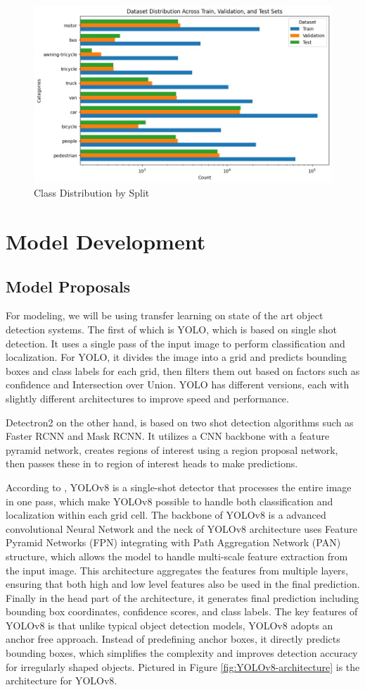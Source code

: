 \documentclass[stu,12pt,floatsintext]{apa7}
\begin{document}
\begin{figure}[!htb]
	\centering
	\includegraphics[width=0.75\linewidth]{class_distribution.png}
	\caption{Class Distribution by Split}
	\label{fig:cls_distrib}
\end{figure}

\section{Model Development}
\subsection{Model Proposals}
For modeling, we will be using transfer learning on state of the art object detection systems. The first of which is YOLO, which is based on single shot detection. It uses a single pass of the input image to perform classification and localization. For YOLO, it divides the image into a grid and predicts bounding boxes and class labels for each grid, then filters them out based on factors such as confidence and Intersection over Union. YOLO has different versions, each with slightly different architectures to improve speed and performance.

Detectron2 on the other hand, is based on two shot detection algorithms such as Faster RCNN and Mask RCNN. It utilizes a CNN backbone with a feature pyramid network, creates regions of interest using a region proposal network, then passes these in to region of interest heads to make predictions.

According to \textcite{yaseen_what_2024},  YOLOv8 is a single-shot detector that processes the entire image in one pass, which make YOLOv8 possible to handle both classification and localization within each grid cell. The backbone of YOLOv8 is a advanced convolutional Neural Network and the neck of YOLOv8 architecture uses Feature Pyramid Networks (FPN) integrating with Path Aggregation Network (PAN) structure, which allows the model to handle multi-scale feature extraction from the input image. This architecture aggregates the features from multiple layers, ensuring that both high and low level features also be used in the final prediction. Finally in the head part of the architecture, it generates final prediction including bounding box coordinates, confidence scores, and class labels. The key features of YOLOv8 is that unlike typical object detection models, YOLOv8 adopts an anchor free approach. Instead of predefining anchor boxes, it directly predicts bounding boxes, which simplifies the complexity and improves detection accuracy for irregularly shaped objects. Pictured in Figure \ref{fig:YOLOv8-architecture} is the architecture for YOLOv8.
\end{document}
